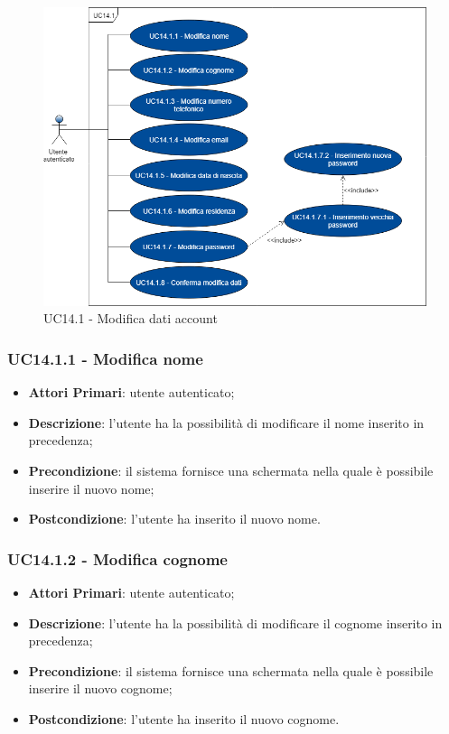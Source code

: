 \begin{figure}[h]
	\includegraphics[width=14cm]{res/images/UC14-1Modifica.png}
	\centering
	\caption{UC14.1 - Modifica dati account}
\end{figure}
\newpage 
\subsubsection{UC14.1.1 - Modifica nome}
\begin{itemize}
	\item \textbf{Attori Primari}: utente autenticato;
	\item \textbf{Descrizione}: l'utente ha la possibilità di modificare il nome inserito in precedenza;
	\item \textbf{Precondizione}: il sistema fornisce una schermata nella quale è possibile inserire il nuovo nome;
	\item \textbf{Postcondizione}: l'utente ha inserito il nuovo nome.
\end{itemize}

\subsubsection{UC14.1.2 - Modifica cognome}
\begin{itemize}
	\item \textbf{Attori Primari}: utente autenticato;
	\item \textbf{Descrizione}: l'utente ha la possibilità di modificare il cognome inserito in precedenza;
	\item \textbf{Precondizione}: il sistema fornisce una schermata nella quale è possibile inserire il nuovo cognome;
	\item \textbf{Postcondizione}: l'utente ha inserito il nuovo cognome.
\end{itemize}

